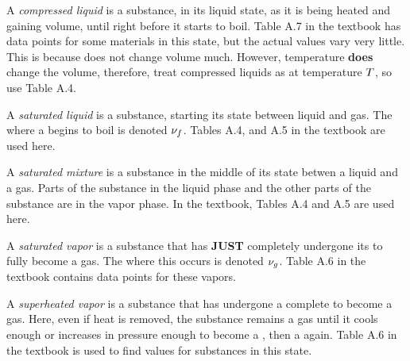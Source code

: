 \begin{definition}\label{def:Compressed_Liquid}
  A \emph{compressed liquid} is a substance, in its liquid state, as it is being heated and gaining volume, until right before it starts to boil.
  Table A.7 in the textbook has data points for some materials in this state, but the actual values vary very little.
  This is because  does not change volume much.
  However, temperature \textbf{does} change the volume, therefore, treat compressed liquids as  at temperature $T$, so use Table A.4.
\end{definition}

\begin{definition}\label{def:Saturated_Liquid}
  A \emph{saturated liquid} is a substance, starting its  state between liquid and gas.
  The  where a  begins to boil is denoted $\nu_{f}$.
  Tables A.4, and A.5 in the textbook are used here.
\end{definition}

\begin{definition}\label{def:Saturated_Mixture}
  A \emph{saturated mixture} is a substance in the middle of its  state betwen a liquid and a gas.
  Parts of the substance in the liquid phase and the other parts of the substance are in the vapor phase.
  In the textbook, Tables A.4 and A.5 are used here.
\end{definition}

\begin{definition}\label{def:Saturated_Vapor}
  A \emph{saturated vapor} is a substance that has \textbf{JUST} completely undergone its  to fully become a gas.
  The  where this occurs is denoted $\nu_{g}$.
  Table A.6 in the textbook contains data points for these vapors.
\end{definition}

\begin{definition}\label{def:Superheated_Vapor}
  A \emph{superheated vapor} is a substance that has undergone a complete  to become a gas.
  Here, even if heat is removed, the substance remains a gas until it cools enough or increases in pressure enough to become a , then a  again.
  Table A.6 in the textbook is used to find values for substances in this state.
\end{definition}

